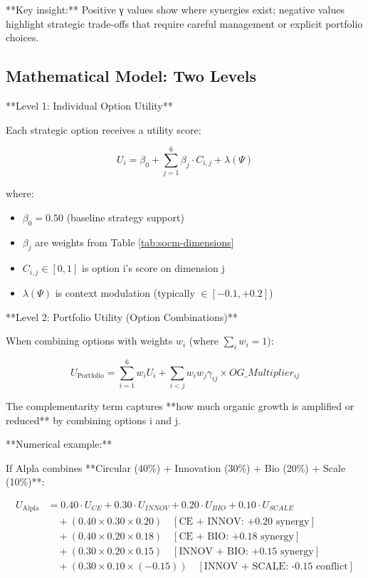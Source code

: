 **Key insight:** Positive γ values show where synergies exist; negative values highlight strategic trade-offs that require careful management or explicit portfolio choices.

\subsection{Mathematical Model: Two Levels}
\label{subsec:socm-math}

**Level 1: Individual Option Utility**

Each strategic option receives a utility score:

\begin{equation}
\label{eq:socm-individual}
U_i = \beta_0 + \sum_{j=1}^{6} \beta_j \cdot C_{i,j} + \lambda(\Psi)
\end{equation}

where:
\begin{itemize}
    \item $\beta_0 = 0.50$ (baseline strategy support)
    \item $\beta_j$ are weights from Table \ref{tab:socm-dimensions}
    \item $C_{i,j} \in [0, 1]$ is option i's score on dimension j
    \item $\lambda(\Psi)$ is context modulation (typically $\in [-0.1, +0.2]$)
\end{itemize}

**Level 2: Portfolio Utility (Option Combinations)**

When combining options with weights $w_i$ (where $\sum_i w_i = 1$):

\begin{equation}
\label{eq:socm-portfolio}
U_{\text{Portfolio}} = \sum_{i=1}^{6} w_i U_i + \sum_{i<j} w_i w_j \gamma_{ij} \times OG\_Multiplier_{ij}
\end{equation}

The complementarity term captures **how much organic growth is amplified or reduced** by combining options i and j.

**Numerical example:**

If Alpla combines **Circular (40\%) + Innovation (30\%) + Bio (20\%) + Scale (10\%)**:

\begin{align}
U_{\text{Alpla}} &= 0.40 \cdot U_{CE} + 0.30 \cdot U_{INNOV} + 0.20 \cdot U_{BIO} + 0.10 \cdot U_{SCALE} \\
&\quad + (0.40 \times 0.30 \times 0.20) \quad [\text{CE + INNOV: +0.20 synergy}] \\
&\quad + (0.40 \times 0.20 \times 0.18) \quad [\text{CE + BIO: +0.18 synergy}] \\
&\quad + (0.30 \times 0.20 \times 0.15) \quad [\text{INNOV + BIO: +0.15 synergy}] \\
&\quad + (0.30 \times 0.10 \times (-0.15)) \quad [\text{INNOV + SCALE: -0.15 conflict}]
\end{align}

